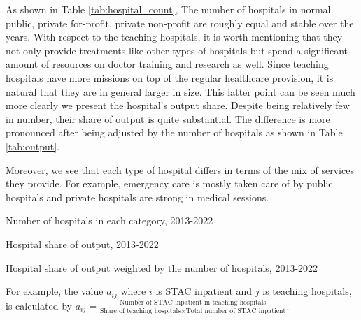 \documentclass[12pt]{article}
\begin{document}
As shown in Table \ref{tab:hospital_count}, The number of hospitals in normal
public, private for-profit, private non-profit are roughly equal and stable
over the years. With respect to the teaching hospitals, it is worth mentioning
that they not only provide treatments like other types of hospitals but spend a
significant amount of resources on doctor training and research as well. Since
teaching hospitals have more missions on top of the regular healthcare
provision, it is natural that they are in general larger in size. This latter
point can be seen much more clearly we present the hospital's output share.
Despite being relatively few in number, their share of output is quite
substantial. The difference is more pronounced after being adjusted by the
number of hospitals as shown in Table \ref{tab:output}.

Moreover, we see that each type of hospital differs in terms of the mix of
services they provide. For example, emergency care is mostly taken care of by
public hospitals and private hospitals are strong in medical sessions.

\begin{table}
    \centering
    
    \caption{Number of hospitals in each category, 2013-2022}
    \label{tab:hospital_count}
\end{table}

\begin{table}\fontsize{10pt}{12pt}\selectfont

    \centering
    \begin{threeparttable}[b]

        
        \caption{Hospital share of output, 2013-2022}
        \label{tab:nonadjusted}
    \end{threeparttable}
\end{table}

\begin{table}\fontsize{10pt}{12pt}\selectfont
    \centering
    \begin{threeparttable}[b]
        
        \caption{Hospital share of output weighted by the number of hospitals, 2013-2022}
        \label{tab:output}
        \begin{tablenotes}
            \footnotesize
            For example, the value $a_{ij}$ where $i$ is STAC inpatient and $j$ is teaching hospitals, is calculated by $a_{ij}= \frac{\text{Number of STAC inpatient  in teaching hospitals}}{\text{Share of teaching hospitals}\times \text{Total number of STAC inpatient}}$.
        \end{tablenotes}

    \end{threeparttable}
\end{table}
\end{document}
